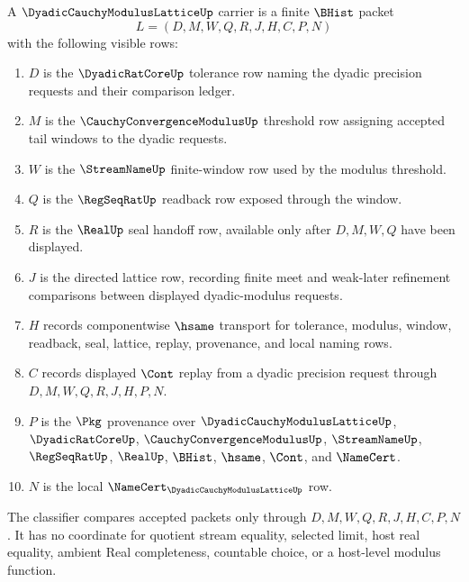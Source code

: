 \begin{definition}
\label{def:dyadic-cauchy-modulus-lattice-carrier}
A $\DyadicCauchyModulusLatticeUp$ carrier is a finite $\BHist$ packet
$$
L=(D,M,W,Q,R,J,H,C,P,N)
$$
with the following visible rows:
\begin{enumerate}
\item $D$ is the $\DyadicRatCoreUp$ tolerance row naming the dyadic precision requests and their comparison ledger.
\item $M$ is the $\CauchyConvergenceModulusUp$ threshold row assigning accepted tail windows to the dyadic requests.
\item $W$ is the $\StreamNameUp$ finite-window row used by the modulus threshold.
\item $Q$ is the $\RegSeqRatUp$ readback row exposed through the window.
\item $R$ is the $\RealUp$ seal handoff row, available only after $D,M,W,Q$ have been displayed.
\item $J$ is the directed lattice row, recording finite meet and weak-later refinement comparisons between displayed dyadic-modulus requests.
\item $H$ records componentwise $\hsame$ transport for tolerance, modulus, window, readback, seal, lattice, replay, provenance, and local naming rows.
\item $C$ records displayed $\Cont$ replay from a dyadic precision request through $D,M,W,Q,R,J,H,P,N$.
\item $P$ is the $\Pkg$ provenance over $\DyadicCauchyModulusLatticeUp$, $\DyadicRatCoreUp$, $\CauchyConvergenceModulusUp$, $\StreamNameUp$, $\RegSeqRatUp$, $\RealUp$, $\BHist$, $\hsame$, $\Cont$, and $\NameCert$.
\item $N$ is the local $\NameCert_{\DyadicCauchyModulusLatticeUp}$ row.
\end{enumerate}
The classifier compares accepted packets only through $D,M,W,Q,R,J,H,C,P,N$. It has no coordinate for quotient stream equality, selected limit, host real equality, ambient Real completeness, countable choice, or a host-level modulus function.
\end{definition}


